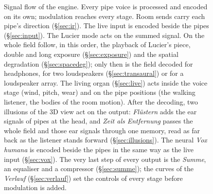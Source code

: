 \documentclass[11pt,a4paper,parskip=half,DIV=11,toc=bibliography]{scrartcl}
\newcommand{\ui}[1]{\emph{#1}}                 %
\begin{document}
\begin{figure}[t]
{}
\caption{Signal flow of the engine. Every pipe voice is processed and encoded on its own; modulation reaches
every stage. Room sends carry each pipe's direction (\S\ref{sec:ir}). The live input is encoded beside the pipes (\S\ref{sec:input}). The Lucier mode acts on the summed signal. On the whole field follow, in this order, the playback of
Lucier's piece, double and long exposure (\S\ref{sec:exposure}) and the spatial degradation (\S\ref{sec:spacedeg}); only then
is the field decoded for headphones, for two loudspeakers (\S\ref{sec:transaural}) or for a loudspeaker array. The living organ (\S\ref{sec:live}) acts
inside the voice stage (wind, pitch, wear) and on the pipe positions (the walking listener, the bodies of the room motion). After the decoding,
two illusions of the 3D view act on the output: \ui{Flüstern} adds the ear signals of pipes at the head, and \ui{Zeit als Entfernung} passes the whole
field and those ear signals through one memory, read as far back as the listener stands forward (\S\ref{sec:illusions}). The neural \ui{Vox humana}
is encoded beside the pipes in the same way as the live input (\S\ref{sec:vox}). The very last step of every output is the \ui{Summe}, an equaliser and
a compressor (\S\ref{sec:summe}); the curves of the \ui{Verlauf} (\S\ref{sec:verlauf}) set the controls of every stage before modulation is added.}
\label{fig:signalflow}
\end{figure}
\end{document}
